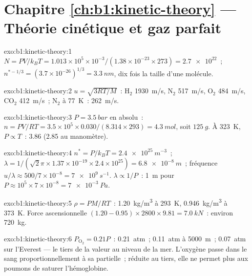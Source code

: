 \section*{Chapitre \ref{ch:b1:kinetic-theory} --- Théorie cinétique et gaz parfait}

\begin{solution}{exo:b1:kinetic-theory:1}
$N = PV/k_BT = 1.013\times10^5 \times 10^{-3}/(1.38\times10^{-23} \times 273) =
\num{2.7e22}$~; $n^{*-1/3} = (3.7\times10^{-26})^{1/3} = \qty{3.3}{nm}$, dix
fois la taille d'une molécule.
\end{solution}

\begin{solution}{exo:b1:kinetic-theory:2}
$u = \sqrt{3RT/M}$~: H$_2$ \qty{1930}{m/s}, N$_2$ \qty{517}{m/s}, O$_2$
\qty{484}{m/s}, CO$_2$ \qty{412}{m/s}~; N$_2$ à \qty{77}{K}~: \qty{262}{m/s}.
\end{solution}

\begin{solution}{exo:b1:kinetic-theory:3}
$P = \qty{3.5}{bar}$ en absolu~: $n = PV/RT = 3.5\times10^5 \times 0.030/(8.314
\times 293) = \qty{4.3}{mol}$, soit $\qty{125}{g}$. À \qty{323}{K}, $P \propto T$~:
\qty{3.86}{} (\qty{2.85}{} au manomètre).
\end{solution}

\begin{solution}{exo:b1:kinetic-theory:4}
$n^* = P/k_BT = \qty{2.4e25}{m^{-3}}$~; $\lambda = 1/(\sqrt2\pi \times 1.37\times
10^{-19} \times 2.4\times10^{25}) = \qty{6.8e-8}{m}$~; fréquence $u/\lambda \approx
500/7\times10^{-8} = \qty{7e9}{s^{-1}}$. $\lambda \propto 1/P$~: \qty{1}{m} pour
$P \approx 10^5 \times 7\times10^{-8} = \qty{7e-3}{Pa}$.
\end{solution}

\begin{solution}{exo:b1:kinetic-theory:5}
$\rho = PM/RT$~: \qty{1.20}{kg/m^3} à \qty{293}{K}, \qty{0.946}{kg/m^3} à
\qty{373}{K}. Force ascensionnelle $(1.20 - 0.95) \times 2800 \times 9.81 = \qty{7.0}{kN}$~:
environ \qty{720}{kg}.
\end{solution}

\begin{solution}{exo:b1:kinetic-theory:6}
$P_{\mathrm{O}_2} = 0.21P$~: \qty{0.21}{atm}~; \qty{0.11}{atm} à \qty{5000}{m}~;
\qty{0.07}{atm} sur l'Everest --- le tiers de la valeur au niveau de la mer.
L'oxygène passe dans le sang proportionnellement à sa  partielle~;
réduite au tiers, elle ne permet plus aux poumons de saturer l'hémoglobine.
\end{solution}


